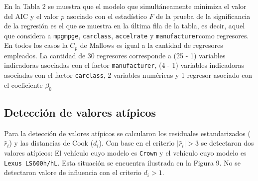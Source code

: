 \documentclass[11pt]{article}
\begin{document}
    
    En la Tabla 2 se muestra que el modelo que simultáneamente minimiza el
valor del AIC y el valor \(p\) asociado con el estadístico \(F\) de la
prueba de la significancia de la regresión es el que se muestra en la
última fila de la tabla, es decir, aquel que considera a
\texttt{mpgmpge}, \texttt{carclass}, \texttt{accelrate} y
\texttt{manufacturer}como regresores. En todos los casos la \(C_p\) de
Mallows es igual a la cantidad de regresores empleados. La cantidad de
30 regresores corresponde a (25 - 1) variables indicadoras asociadas con
el factor \texttt{manufacturer}, (4 - 1) variables indicadoras asociadas
con el factor \texttt{carclass}, 2 variables numéricas y 1 regresor
asociado con el coeficiente \(\beta_0\)

    \hypertarget{detecciuxf3n-de-valores-atuxedpicos}{%
\subsection{Detección de valores
atípicos}\label{detecciuxf3n-de-valores-atuxedpicos}}

    Para la detección de valores atípicos se calcularon los residuales
estandarizados (\(\hat{r}_i\)) y las distancias de Cook (\(d_i\)). Con
base en el criterio \(|\hat{r}_i| > 3\) se detectaron dos valores
atípicos: El vehículo cuyo modelo es \texttt{Crown} y el vehículo cuyo
modelo es \texttt{Lexus\ LS600h/hL}. Esta situación se encuentra
ilustrada en la Figura 9. No se detectaron valore de influencia con el
criterio \(d_i > 1\).

    \begin{center}
    \end{center}
    
\end{document}

